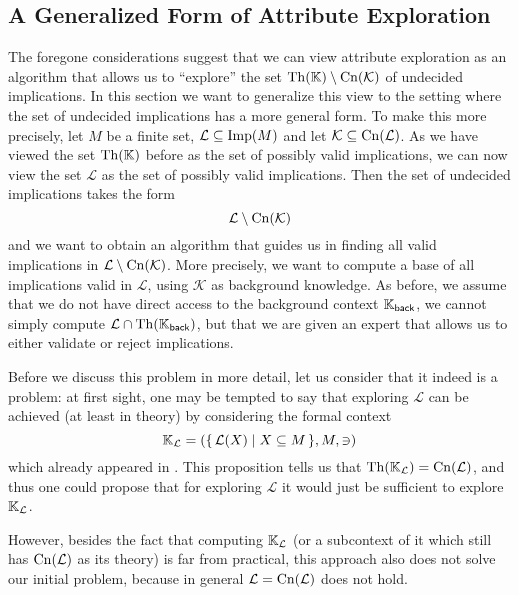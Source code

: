 \subsection{A Generalized Form of Attribute Exploration}
\label{sec:gener-form-attr}

The foregone considerations suggest that we can view attribute exploration as an algorithm
that allows us to ``explore'' the set $\operatorname{Th}({\mathbb{K}}) \setminus \operatorname{Cn}(\mathcal{K})$ of
undecided implications.  In this section we want to generalize this view to the setting
where the set of undecided implications has a more general form.  To make this more
precisely, let $M$ be a finite set, $\mathcal{L} \subseteq \operatorname{Imp}(M)$ and let $\mathcal{K}
\subseteq \operatorname{Cn}(\mathcal{L})$.  As we have viewed the set $\operatorname{Th}({\mathbb{K}})$ before as the set of
possibly valid implications, we can now view the set $\mathcal{L}$ as the set of possibly
valid implications.  Then the set of undecided implications takes the form
\begin{equation*}
  \mathcal{L} \setminus \operatorname{Cn}(\mathcal{K})
\end{equation*}
and we want to obtain an algorithm that guides us in finding all valid implications in
$\mathcal{L} \setminus \operatorname{Cn}(\mathcal{K})$.  More precisely, we want to compute a base of
all implications valid in $\mathcal{L}$, using $\mathcal{K}$ as background knowledge.  As
before, we assume that we do not have direct access to the background context ${\mathbb{K}}_{\mathsf{back}}$, \ie we cannot simply compute $\mathcal{L} \cap \operatorname{Th}({\mathbb{K}}_{\mathsf{back}})$, but that we are given an expert that allows us to either validate or
reject implications.

Before we discuss this problem in more detail, let us consider that it indeed is a
problem: at first sight, one may be tempted to say that exploring $\mathcal{L}$ can be
achieved (at least in theory) by considering the formal context
\begin{equation*}
  {\ensuremath{\mathbb{K}}}_{\mathcal{L}} = ({\{\, \mathcal{L}(X) \mid X \subseteq M \,\}}, M, \ni)
\end{equation*}
which already appeared in .  This proposition
tells us that $\operatorname{Th}({\mathbb{K}}_{\mathcal{L}}) = \operatorname{Cn}(\mathcal{L})$, and thus one could propose
that for exploring $\mathcal{L}$ it would just be sufficient to explore ${\mathbb{K}}_{\mathcal{L}}$.

However, besides the fact that computing ${\mathbb{K}}_{\mathcal{L}}$ (or a subcontext of it
which still has $\operatorname{Cn}(\mathcal{L})$ as its theory) is far from practical, this approach
also does not solve our initial problem, because in general $\mathcal{L} =
\operatorname{Cn}(\mathcal{L})$ does not hold.


